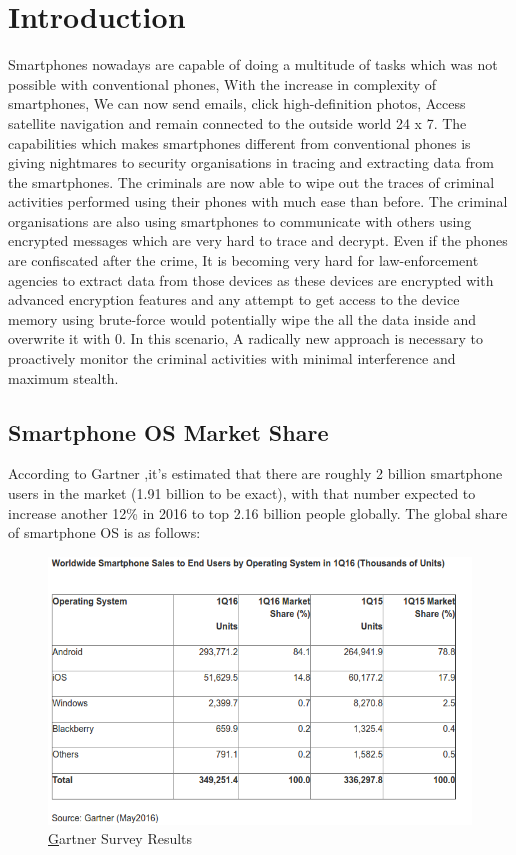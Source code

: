 \chapter{Introduction}

Smartphones nowadays are capable of doing a multitude of tasks which was not possible with conventional phones, With the increase in complexity of smartphones, We can now send emails, click high-definition photos, Access satellite navigation and remain connected to the outside world 24 x 7.  The capabilities which makes smartphones different from conventional phones is giving nightmares to security organisations in tracing and extracting data from the smartphones.  The criminals are now  able to wipe out the traces of criminal activities performed using their phones with much ease than before.  The criminal organisations are also using smartphones to communicate with others using encrypted messages which are very hard to trace and decrypt.  Even if the phones are confiscated after the crime, It is becoming very hard for law-enforcement agencies to extract data from those devices as these devices are encrypted with advanced encryption features and any attempt to get access to the device memory using brute-force would potentially wipe the all the data inside and overwrite it with 0. In this scenario, A radically new approach is necessary to proactively monitor the criminal activities with minimal interference and maximum stealth.

\section{Smartphone OS Market Share}

According to Gartner ,it's estimated that there are roughly 2 billion smartphone users in the market (1.91 billion to be exact), with that number expected to increase another 12\% in 2016 to top 2.16 billion people globally. The global share of smartphone OS is as follows:

\begin{figure}
   \vspace*{-1cm}
    \includegraphics[height=0.5\textheight]{Figures/fig01/gartner}
    \caption{\href{http://www.gartner.com/newsroom/id/3323017} Gartner Survey Results}
    \label{gartner}
   
    
  \end{figure}


